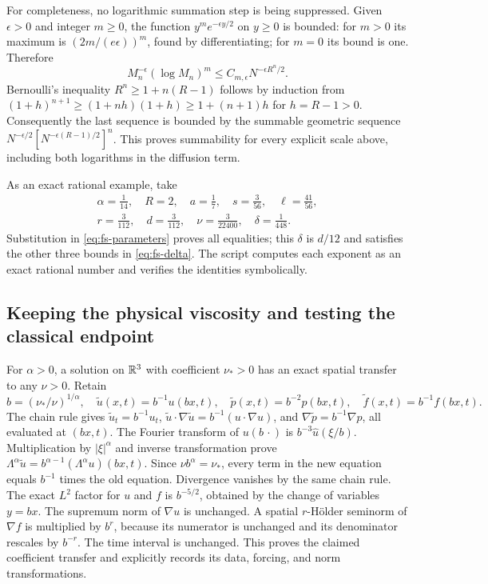 For completeness, no logarithmic summation step is being suppressed. Given
$\epsilon>0$ and integer $m\geq0$, the function
$y^m e^{-\epsilon y/2}$ on $y\geq0$ is bounded: for $m>0$ its maximum is
$(2m/(e\epsilon))^m$, found by differentiating; for $m=0$ its bound is one.
Therefore
\[
 M_n^{-\epsilon}(\log M_n)^m
 \leq C_{m,\epsilon}N^{-\epsilon R^n/2}.
\]
Bernoulli's inequality $R^n\geq1+n(R-1)$ follows by induction from
$(1+h)^{n+1}\geq(1+nh)(1+h)\geq1+(n+1)h$ for $h=R-1>0$.
Consequently the last sequence is bounded by the summable geometric sequence
$N^{-\epsilon/2}[N^{-\epsilon(R-1)/2}]^n$. This proves summability for every
explicit scale above, including both logarithms in the diffusion term.

As an exact rational example, take
\begin{gather*}
 \alpha=\frac1{14},\quad R=2,\quad a=\frac17,
 \quad s=\frac3{56},\quad \ell=\frac{41}{56},\\
 r=\frac3{112},\quad d=\frac3{112},\quad
 \nu=\frac3{22400},\quad \delta=\frac1{448}.
\end{gather*}
Substitution in \eqref{eq:fs-parameters} proves all equalities; this $\delta$
is $d/12$ and satisfies the other three bounds in \eqref{eq:fs-delta}.
The script  computes each exponent as an
exact rational number and verifies the identities symbolically.

\subsection{Keeping the physical viscosity and testing the classical endpoint}

For $\alpha>0$, a solution on $\mathbb R^3$ with coefficient $\nu_*>0$ has an exact spatial
transfer to any $\nu>0$. Retain
\[
 b=(\nu_*/\nu)^{1/\alpha},\quad
 \widetilde u(x,t)=b^{-1}u(bx,t),\quad
 \widetilde p(x,t)=b^{-2}p(bx,t),\quad
 \widetilde f(x,t)=b^{-1}f(bx,t).                \tag{FS16}
\]
The chain rule gives $\widetilde u_t=b^{-1}u_t$,
$\widetilde u\cdot\nabla\widetilde u=b^{-1}(u\cdot\nabla u)$,
and $\nabla\widetilde p=b^{-1}\nabla p$, all evaluated at $(bx,t)$.
The Fourier transform of $u(b\,\cdot)$ is $b^{-3}\widehat u(\xi/b)$.
Multiplication by $|\xi|^\alpha$ and inverse transformation prove
$\Lambda^\alpha\widetilde u=b^{\alpha-1}(\Lambda^\alpha u)(bx,t)$.
Since $\nu b^\alpha=\nu_*$, every term in the new equation equals
$b^{-1}$ times the old equation. Divergence vanishes by the same chain rule.
The exact $L^2$ factor for $u$ and $f$ is $b^{-5/2}$, obtained by the change of
variables $y=bx$. The supremum norm of $\nabla u$ is unchanged. A spatial
$r$-H\"older seminorm of $\nabla f$ is multiplied by $b^r$, because its
numerator is unchanged and its denominator rescales by $b^{-r}$.
The time interval is unchanged. This proves the claimed coefficient transfer
and explicitly records its data, forcing, and norm transformations.

